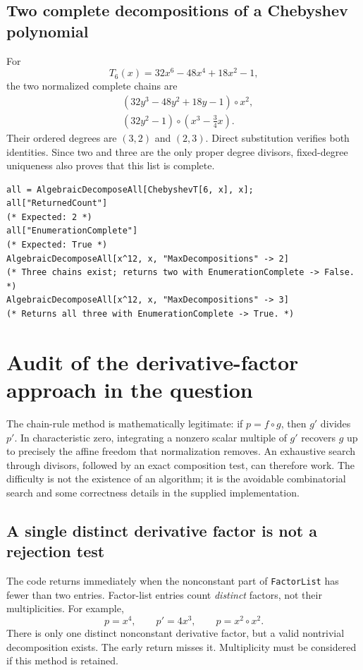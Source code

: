 \documentclass[11pt,letterpaper]{article}
\theoremstyle{definition}
\theoremstyle{remark}
\newcommand{\wt}[1]{\texttt{#1}}
\begin{document}
\subsection{Two complete decompositions of a Chebyshev polynomial}
For
\[
 T_6(x)=32x^6-48x^4+18x^2-1,
\]
the two normalized complete chains are
\begin{align*}
 &(32y^3-48y^2+18y-1)\circ x^2,\\
 &(32y^2-1)\circ\left(x^3-\frac34x\right).
\end{align*}
Their ordered degrees are $(3,2)$ and $(2,3)$. Direct substitution
verifies both identities. Since two and three are the only proper degree
divisors, fixed-degree uniqueness also proves that this list is complete.

\begin{lstlisting}
all = AlgebraicDecomposeAll[ChebyshevT[6, x], x];
all["ReturnedCount"]
(* Expected: 2 *)
all["EnumerationComplete"]
(* Expected: True *)
AlgebraicDecomposeAll[x^12, x, "MaxDecompositions" -> 2]
(* Three chains exist; returns two with EnumerationComplete -> False. *)
AlgebraicDecomposeAll[x^12, x, "MaxDecompositions" -> 3]
(* Returns all three with EnumerationComplete -> True. *)
\end{lstlisting}

\section{Audit of the derivative-factor approach in the question}
\label{sec:audit}
The chain-rule method is mathematically legitimate: if $p=f\circ g$,
then $g'$ divides $p'$. In characteristic zero, integrating a nonzero
scalar multiple of $g'$ recovers $g$ up to precisely the affine freedom
that normalization removes. An exhaustive search through divisors,
followed by an exact composition test, can therefore work. The difficulty
is not the existence of an algorithm; it is the avoidable combinatorial
search and some correctness details in the supplied implementation.

\subsection{A single distinct derivative factor is not a rejection test}
The code returns immediately when the nonconstant part of \wt{FactorList}
has fewer than two entries. Factor-list entries count \emph{distinct}
factors, not their multiplicities. For example,
\[
 p=x^4,
 \qquad p'=4x^3,
 \qquad p=x^2\circ x^2.
\]
There is only one distinct nonconstant derivative factor, but a valid
nontrivial decomposition exists. The early return misses it. Multiplicity
must be considered if this method is retained.
\end{document}
